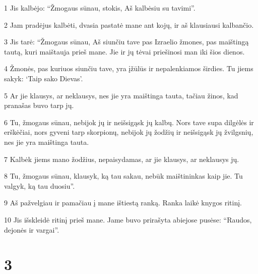 \par 1 Jis kalbėjo: “Žmogaus sūnau, stokis, Aš kalbėsiu su tavimi”. 
\par 2 Jam pradėjus kalbėti, dvasia pastatė mane ant kojų, ir aš klausiausi kalbančio. 
\par 3 Jis tarė: “Žmogaus sūnau, Aš siunčiu tave pas Izraelio žmones, pas maištingą tautą, kuri maištauja prieš mane. Jie ir jų tėvai priešinosi man iki šios dienos. 
\par 4 Žmonės, pas kuriuos siunčiu tave, yra įžūlūs ir nepalenkiamos širdies. Tu jiems sakyk: ‘Taip sako Dievas’. 
\par 5 Ar jie klausys, ar neklausys, nes jie yra maištinga tauta, tačiau žinos, kad pranašas buvo tarp jų. 
\par 6 Tu, žmogaus sūnau, nebijok jų ir neišsigąsk jų kalbų. Nors tave supa dilgėlės ir erškėčiai, nors gyveni tarp skorpionų, nebijok jų žodžių ir neišsigąsk jų žvilgsnių, nes jie yra maištinga tauta. 
\par 7 Kalbėk jiems mano žodžius, nepaisydamas, ar jie klausys, ar neklausys jų. 
\par 8 Tu, žmogaus sūnau, klausyk, ką tau sakau, nebūk maištininkas kaip jie. Tu valgyk, ką tau duosiu”. 
\par 9 Aš pažvelgiau ir pamačiau į mane ištiestą ranką. Ranka laikė knygos ritinį. 
\par 10 Jis išskleidė ritinį prieš mane. Jame buvo prirašyta abiejose pusėse: “Raudos, dejonės ir vargai”.



\chapter{3}


